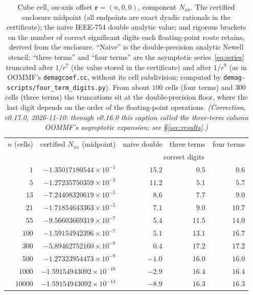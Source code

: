 \documentclass[11pt]{amsart}
\theoremstyle{plain}
\theoremstyle{definition}
\theoremstyle{remark}
\begin{document}
\begin{table}[h]
\centering
\caption{Cube cell, on-axis offset $\mathbf r=(n,0,0)$, component $N_{xx}$. The
certified enclosure midpoint (all endpoints are exact dyadic rationals in the
certificate); the naive IEEE-754 double analytic value; and rigorous brackets on
the number of correct significant digits each floating-point route retains,
derived from the enclosure. ``Naive'' is the double-precision analytic Newell
stencil; ``three terms'' and ``four terms'' are the asymptotic
series~\eqref{eq:series} truncated after $1/r^{7}$ (the value stored in the
certificate) and after $1/r^{9}$ (as in OOMMF's \texttt{demagcoef.cc}, without
its cell subdivision; computed by \texttt{demag-scripts/four\_term\_digits.py}).
From about $100$ cells (four terms) and $300$ cells (three terms) the truncations
sit at the double-precision floor, where the last digit depends on the order of
the floating-point operations. \emph{(Correction, v0.17.0, 2026-11-10: through
v0.16.0 this caption called the three-term column OOMMF's asymptotic expansion;
see \S\ref{sec:results}.)}}
\label{tab:pathology}
\begin{tabular}{r r r r r}
\toprule
$n$ (cells) & certified $N_{xx}$ (midpoint) & naive double & three terms &
four terms \\
 & & \multicolumn{3}{c}{correct digits} \\
\midrule
$1$      & $-1.35017180544\times10^{-1}$ & $15.2$ & $0.5$ & $0.6$ \\
$5$      & $-1.27235750359\times10^{-3}$ & $11.2$ & $5.1$ & $5.7$ \\
$13$     & $-7.24408320619\times10^{-5}$ & $8.6$  & $7.7$ & $9.0$ \\
$21$     & $-1.71854643363\times10^{-5}$ & $7.1$  & $9.0$ & $10.7$ \\
$55$     & $-9.56603669319\times10^{-7}$ & $5.4$  & $11.5$ & $14.0$ \\
$100$    & $-1.59154942396\times10^{-7}$ & $5.1$  & $13.1$ & $16.7$ \\
$300$    & $-5.89462752160\times10^{-9}$ & $\mathbf{0.4}$ & $17.2$ & $17.2$ \\
$500$    & $-1.27323954473\times10^{-9}$ & $-1.0$ & $16.0$ & $16.0$ \\
$1000$   & $-1.59154943092\times10^{-10}$ & $-2.9$ & $16.4$ & $16.4$ \\
$10000$  & $-1.59154943092\times10^{-13}$ & $-8.9$ & $16.3$ & $16.3$ \\
\bottomrule
\end{tabular}
\end{table}
\end{document}
